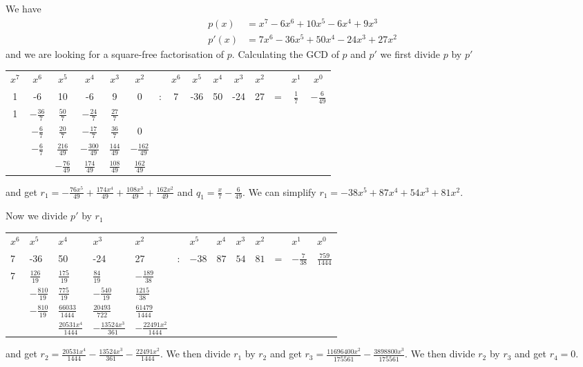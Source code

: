 \documentclass{article}
\begin{document}
We have
\begin{align*}
    p(x) &= x^7 - 6x^6 + 10x^5 - 6x^4 + 9x^3 \\
    p'(x) &= 7x^6 - 36x^5 + 50x^4 - 24x^3 + 27x^2
\end{align*}
and we are looking for a square-free factorisation of $p$. Calculating the GCD of $p$ and $p'$ we first divide $p$ by $p'$
\begin{center}
    \begin{tabular}{ccccccc c cccc c cc}
        $x^7$&$x^6$&$x^5$&$x^4$&$x^3$&$x^2$&&$x^6$&$x^5$&$x^4$&$x^3$&$x^2$&&$x^1$&$x^0$ \\
        1&-6&10&-6&9&0&:&7&-36&50&-24&27&=&$\frac{1}{7}$&$-\frac{6}{49}$\\
        1&$-\frac{36}{7}$&$\frac{50}{7}$&$-\frac{24}{7}$&$\frac{27}{7}$ \\\cmidrule{1-5}
        &$-\frac{6}{7}$&$\frac{20}{7}$&$-\frac{17}{7}$&$\frac{36}{7}$&0\\
        &$-\frac{6}{7}$&$\frac{216}{49}$&$-\frac{300}{49}$&$\frac{144}{49}$&$-\frac{162}{49}$ \\\cmidrule{2-6}
        &&$-\frac{76}{49}$&$\frac{174}{49}$&$\frac{108}{49}$&$\frac{162}{49}$ \\
    \end{tabular}
\end{center}
and get $r_1 = -\frac{76 x^5}{49}+\frac{174 x^4}{49}+\frac{108 x^3}{49}+\frac{162 x^2}{49}$ and $q_1 = \frac{x}{7}-\frac{6}{49}$. We can simplify $r_1 = -38 x^5+87 x^4+54 x^3+81 x^2$.

Now we divide $p'$ by $r_1$
\begin{center}
    \begin{tabular}{lllll l llll l ll}
        $x^6$&$x^5$&$x^4$&$x^3$&$x^2$ && $x^5$&$x^4$&$x^3$&$x^2$ && $x^1$&$x^0$ \\
        7&-36&50&-24&27 &:& $-38$&$87$&$54$&$81$ &=& $-\frac{7}{38}$&$\frac{759}{1444}$ \\
        7&$\frac{126}{19}$&$\frac{175}{19}$&$\frac{84}{19}$&$-\frac{189}{38}$\\\cmidrule{1-5}
        &$-\frac{810}{19}$&$\frac{775}{19}$&$-\frac{540}{19}$&$\frac{1215}{38}$\\
        &$-\frac{810}{19}$&$\frac{66033}{1444}$&$\frac{20493}{722}$&$\frac{61479}{1444}$\\\cmidrule{2-6}
        &&$\frac{20531 x^4}{1444}$&$-\frac{13524 x^3}{361}$&$-\frac{22491 x^2}{1444}$
    \end{tabular}
\end{center}
and get $r_2 = \frac{20531 x^4}{1444}-\frac{13524 x^3}{361}-\frac{22491 x^2}{1444}$. We then divide $r_1$ by $r_2$ and get $r_3 = \frac{11696400 x^2}{175561}-\frac{3898800 x^3}{175561}$. We then divide $r_2$ by $r_3$ and get $r_4 = 0$.
\end{document}
